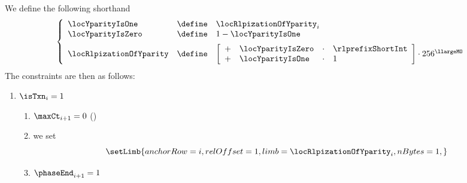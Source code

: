 \begin{center}
\end{center}
We define the following shorthand
\[
	\left\{ \begin{array}{lcl}
		\locYparityIsOne  & \define & \locRlpizationOfYparity _{i}      \\
		\locYparityIsZero & \define & 1 - \locYparityIsOne \vspace{2mm} \\
		\locRlpizationOfYparity & \define &
		\left[ \begin{array}{clcl}
			+ & \locYparityIsZero & \cdot & \rlprefixShortInt \\
			+ & \locYparityIsOne  & \cdot & 1                 \\
		\end{array} \right]
		\cdot 256 ^{\llargeMO} \\
	\end{array} \right.
\]
The constraints are then as follows:
\begin{enumerate}
	\item \If $\isTxn _{i} = 1$ \Then
		\begin{enumerate}
			\item $\maxCt    _{i + 1} = 0$ (\sanityCheck)
			\item we set
				\[
					\setLimb{
						anchorRow = i                            ,
						relOffset = 1                            ,
						limb      = \locRlpizationOfYparity _{i} ,
						nBytes    = 1                            ,
					}
				\]
			\item $\phaseEnd _{i + 1} = 1$
		\end{enumerate}
\end{enumerate}
